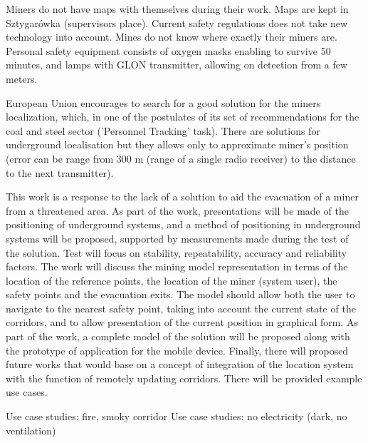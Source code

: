 \documentclass[../main.tex]{subfiles}
\begin{document}
Miners do not have maps with themselves during their work. Maps are kept in Sztygarówka (supervisors place).
Current safety regulations does not take new technology into account. Mines do not know where exactly their miners are. Personal safety equipment consists of oxygen masks enabling to survive 50 minutes, and lamps with GLON transmitter, allowing on detection from a few meters.

European Union encourages to search for a good solution for the miners localization, which, in one of the postulates of its set of recommendations for the coal and steel sector ('Personnel Tracking' task). There are solutions for underground localisation but they allows only to approximate miner's position (error can be range from 300 m (range of a single radio receiver) to the distance to the next transmitter).

This work is a response to the lack of a solution to aid the evacuation of a miner from a threatened area. As part of the work, presentations will be made of the positioning of underground systems, and a method of positioning in underground systems will be proposed, supported by measurements made during the test of the solution. Test will focus on stability, repeatability, accuracy and reliability factors. The work will discuss the mining model representation in terms of the location of the reference points, the location of the miner (system user), the safety points and the evacuation exits. The model should allow both the user to navigate to the nearest safety point, taking into account the current state of the corridors, and to allow presentation of the current position in graphical form. As part of the work, a complete model of the solution will be proposed along with the prototype of application for the mobile device. Finally, there will proposed future works that would base on a concept of integration of the location system with the function of remotely updating corridors. There will be provided example use cases.

  Use case studies: fire, smoky corridor
  Use case studies: no electricity (dark, no ventilation)
\end{document}
